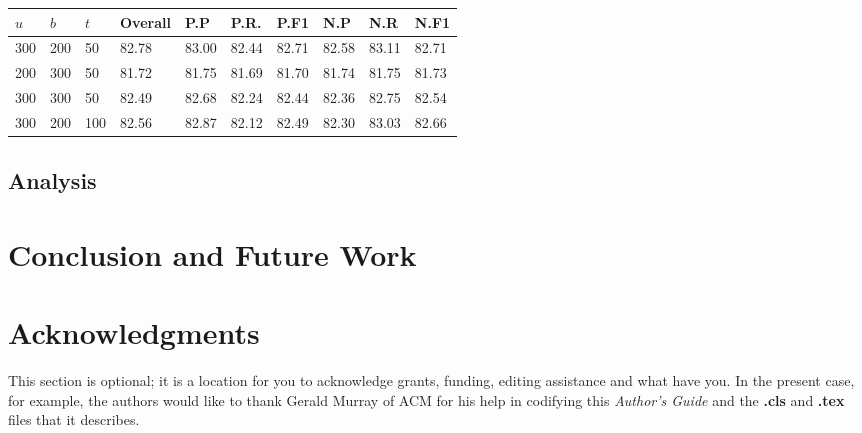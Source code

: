 \documentclass{acm_proc_article-sp}
\begin{document}
\vspace{-3mm}
\tabcolsep=0.11cm
\begin{tabular}{| l | l | l | l | l | l | l | l | l | l |}
\hline
$u$ & $b$ & $t$ & Overall & P.P & P.R. & P.F1 & N.P & N.R & N.F1 \\ \hline
300 & 200 & 50 & 82.78 & 83.00 & 82.44 & 82.71 & 82.58 & 83.11 & 82.71 \\ \hline
200 & 300 & 50 & 81.72 & 81.75 & 81.69 & 81.70 & 81.74 & 81.75 & 81.73 \\ \hline
300 & 300 & 50 & 82.49 & 82.68 & 82.24 & 82.44 & 82.36 & 82.75 & 82.54\\ \hline
300 & 200 & 100 & 82.56 & 82.87 & 82.12 & 82.49 & 82.30 & 83.03 & 82.66\\ \hline
\end{tabular} 

\subsection{Analysis}

\section{Conclusion and Future Work}
\section{Acknowledgments}
This section is optional; it is a location for you
to acknowledge grants, funding, editing assistance and
what have you.  In the present case, for example, the
authors would like to thank Gerald Murray of ACM for
his help in codifying this \textit{Author's Guide}
and the \textbf{.cls} and \textbf{.tex} files that it describes.

%

%
%

\end{document}
